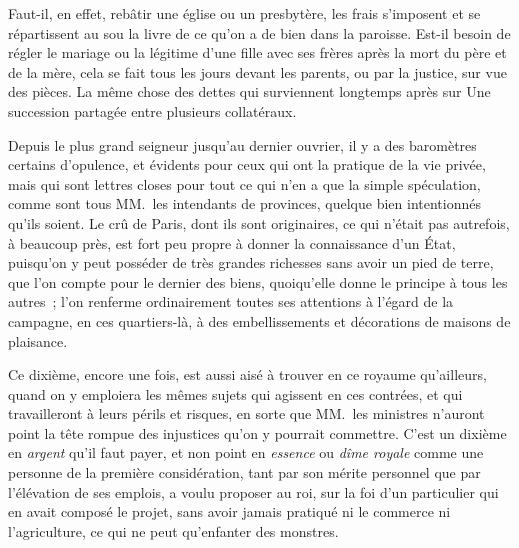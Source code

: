 \documentclass[french,twoside]{book} %
\begin{document}
Faut-il, en effet, rebâtir une église ou un presbytère, les frais s’imposent et se répartissent au sou la livre de ce qu’on a de bien dans la paroisse. Est-il besoin de régler le mariage ou la légitime d’une fille avec ses frères après la mort du père et de la mère, cela se fait tous les jours devant les parents, ou par la justice, sur vue des pièces. La même chose des dettes qui surviennent longtemps après sur Une succession partagée entre plusieurs collatéraux.\par
Depuis le plus grand seigneur jusqu’au dernier ouvrier, il y a des baromètres certains d’opulence, et évidents pour ceux qui ont la pratique de la vie privée, mais qui sont lettres closes pour tout ce qui n’en a que la simple spéculation, comme sont tous MM. les intendants de provinces, quelque bien intentionnés qu’ils soient. Le crû de Paris, dont ils sont originaires, ce qui n’était pas autrefois, à beaucoup près, est fort peu propre à donner la connaissance d’un État, puisqu’on y peut posséder de très grandes richesses sans avoir un pied de terre, que l’on compte pour le dernier des biens, quoiqu’elle donne le principe à tous les autres ; l’on renferme ordinairement toutes ses attentions à l’égard de la campagne, en ces quartiers-là, à des embellissements et décorations de maisons de plaisance.\par
Ce dixième, encore une fois, est aussi aisé à trouver en ce royaume qu’ailleurs, quand on y emploiera les mêmes sujets qui agissent en ces contrées, et qui travailleront à leurs périls et risques, en sorte que MM. les ministres n’auront point la tête rompue des injustices qu’on y pourrait commettre. C’est un dixième en {\itshape argent} qu’il faut payer, et non point en {\itshape essence} ou {\itshape dîme royale} comme une personne de la première considération, tant par son mérite personnel que par l’élévation de ses emplois, a voulu proposer au roi, sur la foi d’un particulier qui en avait composé le projet, sans avoir jamais pratiqué ni le commerce ni l’agriculture, ce qui ne peut qu’enfanter des monstres.\par
\end{document}

